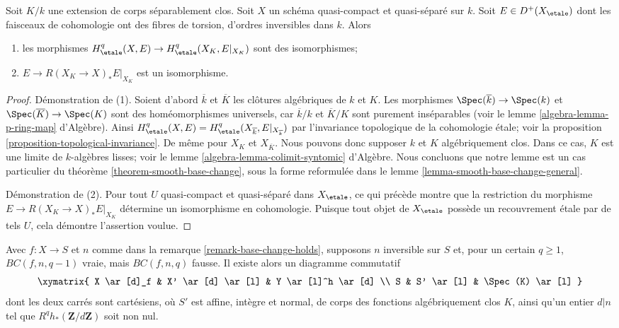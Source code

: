 \begin{lemma}
\label{lemma-smooth-base-change-separably-closed}
Soit $K/k$ une extension de corps séparablement clos. Soit $X$
un schéma quasi-compact et quasi-séparé sur $k$.
Soit $E \in D^+(X_\etale)$ dont les faisceaux de cohomologie ont des fibres
de torsion, d'ordres inversibles dans $k$. Alors
\begin{enumerate}
\item les morphismes $H^q_\etale(X, E) \to H^q_\etale(X_K, E|_{X_K})$
sont des isomorphismes;
\item $E \to R(X_K \to X)_*E|_{X_K}$ est un isomorphisme.
\end{enumerate}
\end{lemma}

\begin{proof}
Démonstration de (1). Soient d'abord $\overline{k}$ et $\overline{K}$
les clôtures algébriques
de $k$ et $K$. Les morphismes $\Spec(\overline{k}) \to \Spec(k)$ et
$\Spec(\overline{K}) \to \Spec(K)$ sont des homéomorphismes universels,
car $\overline{k}/k$ et $\overline{K}/K$ sont purement inséparables
(voir le lemme \ref{algebra-lemma-p-ring-map} d'Algèbre).
Ainsi $H^q_\etale(X, E) =
H^q_\etale(X_{\overline{k}}, E|_{X_{\overline{k}}})$ par
l'invariance topologique de la cohomologie étale; voir la
proposition \ref{proposition-topological-invariance}.
De même pour $X_K$ et $X_{\overline{K}}$.
Nous pouvons donc supposer $k$ et $K$ algébriquement clos.
Dans ce cas, $K$ est une limite de $k$-algèbres lisses; voir le
lemme \ref{algebra-lemma-colimit-syntomic} d'Algèbre.
Nous concluons que notre lemme est un cas particulier du
théorème \ref{theorem-smooth-base-change}, sous la forme reformulée dans le
lemme \ref{lemma-smooth-base-change-general}.

\medskip\noindent
Démonstration de (2). Pour tout $U$ quasi-compact et quasi-séparé dans $X_\etale$,
ce qui précède montre que la restriction du morphisme
$E \to R(X_K \to X)_*E|_{X_K}$ détermine un isomorphisme en cohomologie.
Puisque tout objet de $X_\etale$ possède un recouvrement étale par de tels $U$,
cela démontre l'assertion voulue.
\end{proof}

\begin{lemma}
\label{lemma-base-change-does-not-hold-post}
Avec $f : X \to S$ et $n$ comme dans la remarque \ref{remark-base-change-holds},
supposons $n$ inversible sur $S$ et, pour un certain $q \geq 1$,
$BC(f, n, q - 1)$ vraie, mais $BC(f, n, q)$ fausse.
Il existe alors un diagramme commutatif
$$
\xymatrix{
X \ar[d]_f & X' \ar[d] \ar[l] & Y \ar[l]^h \ar[d] \\
S & S' \ar[l] & \Spec(K) \ar[l]
}
$$
dont les deux carrés sont cartésiens, où $S'$ est affine, intègre et normal,
de corps des fonctions algébriquement clos $K$, ainsi qu'un entier
$d | n$ tel que $R^qh_*(\mathbf{Z}/d\mathbf{Z})$ soit non nul.
\end{lemma}

